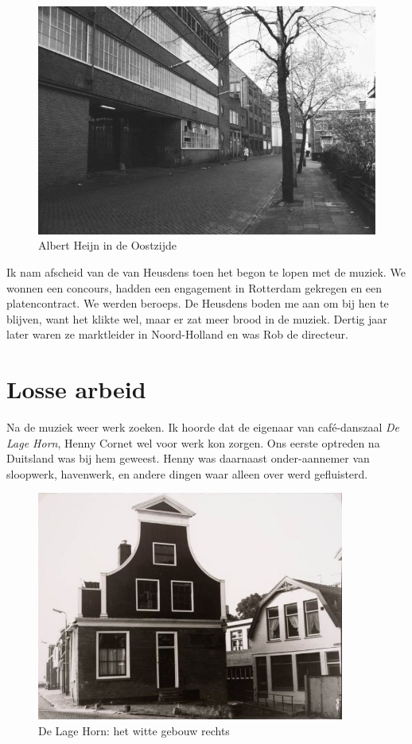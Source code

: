 \documentclass[12pt,twoside, openright]{memoir}
\begin{document}
\begin{figure}
\centering
\includegraphics[width=\textwidth]{img/216vanHeusdenschoonmaak}
\caption*{\footnotesize Albert Heijn in de Oostzijde}
\end{figure}

Ik nam afscheid van de van Heusdens toen het begon te lopen met de muziek. We wonnen een concours, hadden een engagement in Rotterdam gekregen en een platencontract. We werden beroeps. De Heusdens boden me aan om bij hen te blijven, want het klikte wel, maar er zat meer brood in de muziek. Dertig jaar later waren ze marktleider in Noord-Holland en was Rob de directeur.

\section*{Losse arbeid} %
\label{cha:lossearbeid}

Na de muziek weer werk zoeken. Ik hoorde dat de eigenaar van café-danszaal \emph{De Lage Horn}, Henny Cornet wel voor werk kon zorgen. Ons eerste optreden na Duitsland was bij hem geweest. Henny was daarnaast onder-aannemer van sloopwerk, havenwerk, en andere dingen waar alleen over werd gefluisterd. 

\begin{figure}
\centering
\includegraphics[width=0.9\textwidth]{img/218LageHorn2}
\caption*{\footnotesize De Lage Horn: het witte gebouw rechts}
\end{figure}
\end{document}
